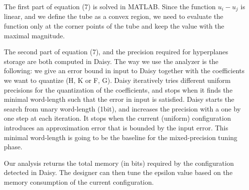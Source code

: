 The first part of equation (7) is solved in MATLAB. Since the function $u_{i}-u_{j}$ is linear, and we define the tube as a convex region, we need to evaluate the function only at the corner points of the tube and keep the value with the maximal magnitude.

The second part of equation (7), and the precision required for hyperplanes storage are both computed in Daisy. 
The way we use the analyzer is the following: we give an error bound in input to Daisy together with the coefficients we want to quantize (H, K or F, G). Daisy iteratively tries different uniform precisions for the quantization of the coefficients, and stops when it finds the minimal word-length such that the error in input is satisfied.
Daisy starts the search from unary word-length (1bit), and increases the precision with a one by one step at each iteration. It stops when the current (uniform) configuration introduces an approximation error that is bounded by the input error. This minimal word-length is going to be the baseline for the mixed-precision tuning phase.

Our analysis returns the total memory (in bits) required by the configuration detected in Daisy. The designer can then tune the epsilon value based on the memory consumption of the current configuration. 
